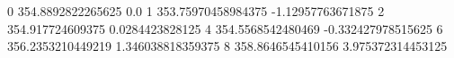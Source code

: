 0 354.8892822265625 0.0
1 353.75970458984375 -1.12957763671875
2 354.917724609375 0.0284423828125
4 354.5568542480469 -0.332427978515625
6 356.2353210449219 1.346038818359375
8 358.8646545410156 3.975372314453125
